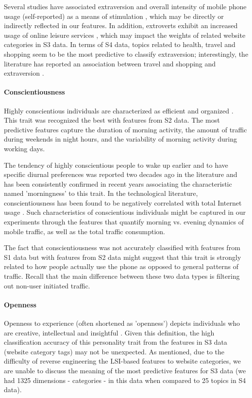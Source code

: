 Several studies have associated extraversion and overall intensity of mobile phone usage (self-reported) as a means of stimulation \cite{carrascosa2015always, ramirez2010relationship}, which may be directly or indirectly reflected in our features. In addition, extroverts exhibit an increased usage of online leisure services \cite{amichai2008personality}, which may impact the weights of related website categories in S3 data. In terms of S4 data, topics related to health, travel and shopping seem to be the most predictive to classify extraversion; interestingly, the literature has reported an association between travel and shopping and extraversion \cite{hoxter1988tourist, wang2008passion}.

\paragraph{Conscientiousness} Highly conscientious individuals are characterized as efficient and organized \cite{goldberg2006international}. This trait was recognized the best with features from S2 data. The most predictive features capture the duration of morning activity, the amount of traffic during weekends in night hours, and the variability of morning activity during working days.  

The tendency of highly conscientious people to wake up earlier and to have specific diurnal preferences was reported two decades ago in the literature \cite{jiang2013calling} and has been consistently confirmed in recent years \cite{randler2008morningness} associating the characteristic named 'morningness' to this trait. In the technological literature, conscientiousness has been found to be negatively correlated with total Internet usage \cite{landers2006investigation}. Such characteristics of conscientious individuals might be captured in our experiments through the features that quantify morning vs. evening dynamics of mobile traffic, as well as the total traffic consumption. 

The fact that conscientiousness was not accurately classified with features from S1 data but with features from S2 data might suggest that this trait is strongly related to how people actually use the phone as opposed to general patterns of traffic. Recall that the main difference between these two data types is filtering out non-user initiated traffic. 

\paragraph{Openness} Openness to experience (often shortened as 'openness') depicts individuals who are creative, intellectual and insightful \cite{goldberg2006international}. Given this definition, the high classification accuracy of this personality trait from the features in S3 data (website category tags) may not be unexpected. As mentioned, due to the difficulty of reverse engineering the LSI-based features to website categories, we are unable to discuss the meaning of the most predictive features for S3 data (we had 1325 dimensions - categories - in this data when compared to 25 topics in S4 data). 

